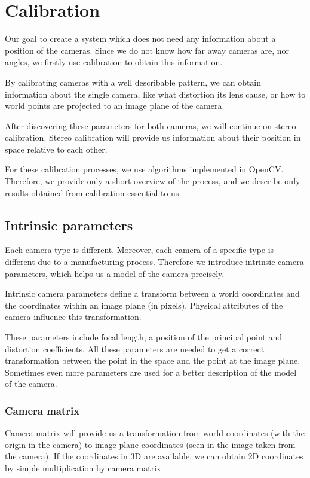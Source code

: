 \chapter{Calibration}

Our goal to create a system which does not need any information about a
position of the cameras. Since we do not know how far away cameras are, nor
angles, we firstly use calibration to obtain this information.

By calibrating cameras with a well describable pattern, we can obtain
information about the single camera, like what distortion its lens cause, or
how to world points are projected to an image plane of the camera.

After discovering these parameters for both cameras, we will continue on stereo
calibration. Stereo calibration will provide us information about their
position in space relative to each other.

For these calibration processes, we use algorithms implemented in OpenCV.
Therefore, we provide only a short overview of the process, and we describe
only results obtained from calibration essential to us.

\section{Intrinsic parameters}

Each camera type is different. Moreover, each camera of a specific type is
different due to a manufacturing process. Therefore we introduce intrinsic
camera parameters, which helps us a model of the camera precisely.

Intrinsic camera parameters define a transform between a world coordinates and
the coordinates within an image plane (in pixels). Physical attributes of the
camera influence this transformation.

These parameters include focal length, a position of the principal point and
distortion coefficients. All these parameters are needed to get a correct
transformation between the point in the space and the point at the image plane.
Sometimes even more parameters are used for a better description of the model
of the camera.

\subsection{Camera matrix} Camera matrix will provide us a transformation from
world coordinates (with the origin in the camera) to image plane coordinates
(seen in the image taken from the camera). If the coordinates in 3D are
available, we can obtain 2D coordinates by simple multiplication by camera
matrix.

